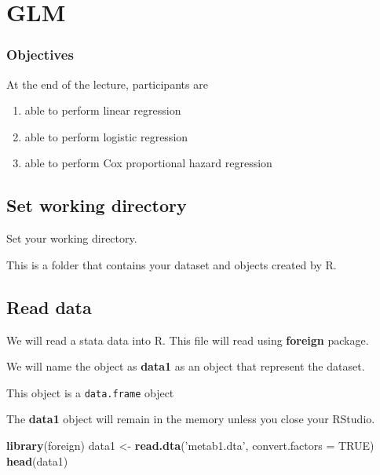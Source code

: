 \documentclass[]{book}
\newenvironment{Shaded}{\begin{snugshade}}{\end{snugshade}}
\newcommand{\KeywordTok}[1]{\textcolor[rgb]{0.13,0.29,0.53}{\textbf{#1}}}
\newcommand{\DataTypeTok}[1]{\textcolor[rgb]{0.13,0.29,0.53}{#1}}
\newcommand{\StringTok}[1]{\textcolor[rgb]{0.31,0.60,0.02}{#1}}
\newcommand{\OtherTok}[1]{\textcolor[rgb]{0.56,0.35,0.01}{#1}}
\newcommand{\NormalTok}[1]{#1}
\providecommand{\tightlist}{%
  \setlength{\itemsep}{0pt}\setlength{\parskip}{0pt}}
\theoremstyle{definition}
\theoremstyle{definition}
\theoremstyle{remark}
\begin{document}
\chapter{GLM}\label{glm}

\subsection{Objectives}\label{objectives-2}

At the end of the lecture, participants are

\begin{enumerate}
\def\labelenumi{\arabic{enumi}.}
\tightlist
\item
  able to perform linear regression
\item
  able to perform logistic regression
\item
  able to perform Cox proportional hazard regression
\end{enumerate}

\section{Set working directory}\label{set-working-directory}

Set your working directory.

This is a folder that contains your dataset and objects created by R.

\section{Read data}\label{read-data-1}

We will read a stata data into R. This file will read using
\textbf{foreign} package.

We will name the object as \textbf{data1} as an object that represent
the dataset.

This object is a \texttt{data.frame} object

The \textbf{data1} object will remain in the memory unless you close
your RStudio.

\begin{Shaded}
\begin{Highlighting}[]
\KeywordTok{library}\NormalTok{(foreign)}
\NormalTok{data1 <-}\StringTok{ }\KeywordTok{read.dta}\NormalTok{(}\StringTok{'metab1.dta'}\NormalTok{, }\DataTypeTok{convert.factors =} \OtherTok{TRUE}\NormalTok{) }
\KeywordTok{head}\NormalTok{(data1)}
\end{Highlighting}
\end{Shaded}
\end{document}
